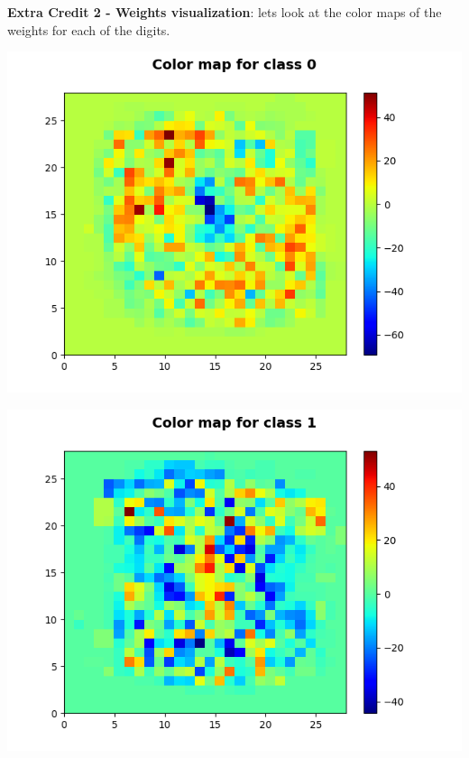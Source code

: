 \documentclass[11pt]{article}
\begin{document}
\textbf{Extra Credit 2 - Weights visualization}: lets look at the color maps of the weights for each of the digits.\\

\begin{center}
\includegraphics[scale=0.80]{part1.ec2/digit0.png}
\end{center}

\begin{center}
\includegraphics[scale=0.80]{part1.ec2/digit1.png}
\end{center}
\end{document}
